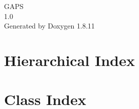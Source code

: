 \documentclass[twoside]{book}
\newcommand{\+}{\discretionary{\mbox{\scriptsize$\hookleftarrow$}}{}{}}
\newcommand{\clearemptydoublepage}{%
  \newpage{\pagestyle{empty}\cleardoublepage}%
}
\begin{document}
\hypersetup{pageanchor=false,
             bookmarksnumbered=true,
             pdfencoding=unicode
            }
\begin{titlepage}
\vspace*{7cm}
\begin{center}%
{\Large G\+A\+PS \\[1ex]\large 1.\+0 }\\
\vspace*{1cm}
{\large Generated by Doxygen 1.8.11}\\
\end{center}
\end{titlepage}
\clearemptydoublepage
\tableofcontents
\clearemptydoublepage
{}
\hypersetup{pageanchor=true}

\chapter{Hierarchical Index}

\chapter{Class Index}

\end{document}
